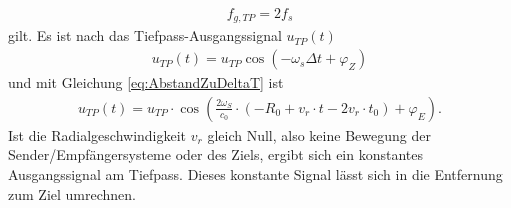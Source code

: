 \begin{align}
f_{g,TP} = 2f_{s}
\end{align}
gilt.
Es ist nach \cite[S.43,S.44]{HuderRadar} das Tiefpass-Ausgangssignal $u_{TP}(t)$
\begin{align}
u_{TP}(t) = u_{TP} \cos \left( -\omega_{s} \Delta t + \varphi_{Z}\right)
\end{align} und mit Gleichung \ref{eq:AbstandZuDeltaT} ist
\begin{align}
u_{TP}(t) = u _{TP} \cdot \cos \left( \frac{2 \omega_{S} }{c_{0}}\cdot \left( -R_{0} + v_{r}\cdot t - 2 v_{r}\cdot t_{0}\right) +\varphi_{E}\right). 
\end{align}
Ist die Radialgeschwindigkeit $v_{r}$ gleich Null, also keine Bewegung der Sender/Empfängersysteme oder des Ziels, ergibt sich ein konstantes Ausgangssignal am Tiefpass. Dieses konstante Signal lässt sich in die Entfernung zum Ziel umrechnen. 
